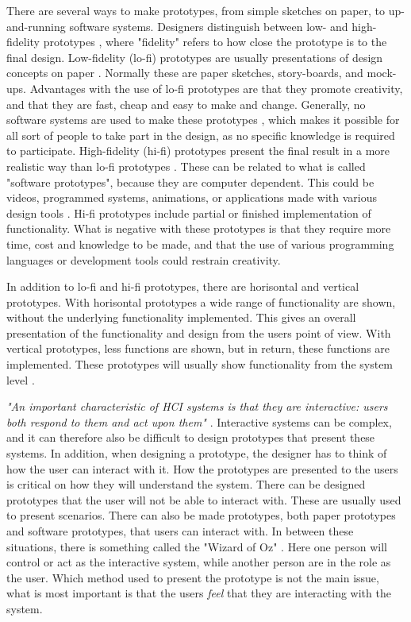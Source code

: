 There are several ways to make prototypes, from simple sketches on paper, to up-and-running software systems. Designers distinguish between low- and high-fidelity prototypes \cite{mackayprototyping} \cite{houde1997prototypes} \cite{mmi}, where "fidelity" refers to how close the prototype is to the final design. Low-fidelity (lo-fi) prototypes are usually presentations of design concepts on paper \cite{mmi} \cite{lofihifi}. Normally these are paper sketches, story-boards, and mock-ups. Advantages with the use of lo-fi prototypes are that they promote creativity, and that they are fast, cheap and easy to make and change. Generally, no software systems are used to make these prototypes \cite{lofihifi}, which makes it possible for all sort of people to take part in the design, as no specific knowledge is required to participate. High-fidelity (hi-fi) prototypes present the final result in a more realistic way than lo-fi prototypes \cite{mmi}. These can be related to what is called "software prototypes", because they are computer dependent. This could be videos, programmed systems, animations, or applications made with various design tools \cite{mackayprototyping}. Hi-fi prototypes include partial or finished implementation of functionality. What is negative with these prototypes is that they require more time, cost and knowledge to be made, and that the use of various programming languages or development tools could restrain creativity. 

In addition to lo-fi and hi-fi prototypes, there are horisontal and vertical prototypes. With horisontal prototypes a wide range of functionality are shown, without the underlying functionality implemented. This gives an overall presentation of the functionality and design from the users point of view. With vertical prototypes, less functions are shown, but in return, these functions are implemented. These prototypes will usually show functionality from the system level \cite{mackayprototyping} \cite{horver}.

\emph{"An important characteristic of HCI systems is that they are interactive: users both respond to them and act upon them"} \cite{mackayprototyping}. Interactive systems can be complex, and it can therefore also be difficult to design prototypes that present these systems. In addition, when designing a prototype, the designer has to think of how the user can interact with it. How the prototypes are presented to the users is critical on how they will understand the system. There can be designed prototypes that the user will not be able to interact with. These are usually used to present scenarios. There can also be made prototypes, both paper prototypes and software prototypes, that users can interact with. In between these situations, there is something called the "Wizard of Oz" \cite{mackayprototyping}. Here one person will control or act as the interactive system, while another person are in the role as the user. Which method used to present the prototype is not the main issue, what is most important is that the users \emph{feel} that they are interacting with the system.

